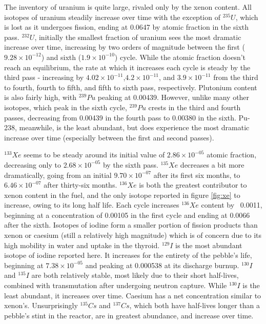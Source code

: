 The inventory of uranium is quite large, rivaled only by the xenon content.  All isotopes of uranium steadily increase over time with the exception of $^{235}U$, which is lost as it undergoes fission, ending at 0.0647 by atomic fraction in the sixth pass.  $^{232}U$, initially the smallest fraction of uranium sees the most dramatic increase over time, increasing by two orders of magnitude between the first ($9.28\times10^{-12}$) and sixth ($1.9\times10^{-10}$) cycle.  While the atomic fraction doesn't reach an equilibrium, the rate at which it increases each cycle is steady by the third pass - increasing by $4.02\times10^{-11}$,$4.2\times10^{-11}$, and $3.9\times10^{-11}$ from the third to fourth, fourth to fifth, and fifth to sixth pass, respectively.  Plutonium content is also fairly high, with $^{239}Pu$ peaking at 0.00439.  However, unlike many other isotopes, which peak in the sixth cycle, $^{239}Pu$ crests in the third and fourth passes, decreasing from 0.00439 in the fourth pass to 0.00380 in the sixth.  Pu-238, meanwhile, is the least abundant, but does experience the most dramatic increase over time (especially between the first and second passes).



$^{133}Xe$ seems to be steady around its initial value of $2.86\times10^{-05}$ atomic fraction, decreasing only to $2.68\times10^{-05}$ by the sixth pass.  $^{135}Xe$ decreases a bit more dramatically, going from an initial $9.70\times10^{-07}$ after its first six months, to  $6.46\times10^{-07}$ after thirty-six months.  $^{136}Xe$ is both the greatest contributor to xenon content in the fuel, and the only isotope reported in  figure \ref{fig:xe} to increase, owing to its long half life.  Each cycle increases $^{136}Xe$ content by ~0.0011, beginning at a concentration of 0.00105 in the first cycle and ending at 0.0066 after the sixth.  Isotopes of iodine form a smaller portion of fission products than xenon or caesium (still a relatively high magnitude) which is of concern due to its high mobility in water and uptake in the thyroid.  $^{129}I$ is the most abundant isotope of iodine reported here.  It increases for the entirety of the pebble's life, beginning at $7.38\times10^{-05}$ and peaking at 0.000538 at its discharge burnup.  $^{130}I$ and $^{135}I$ are both relatively stable, most likely due to their short half-lives, combined with transmutation after undergoing neutron capture.  While $^{130}I$ is the least abundant, it increases over time.  Caesium has a net concentration similar to xenon's.  Unsurprisingly $^{135}Cs$ and $^{137}Cs$, which both have half-lives longer than a pebble's stint in the reactor, are in greatest abundance, and increase over time.


